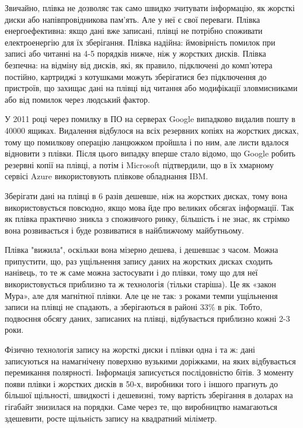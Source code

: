 \documentclass[a4paper,14pt]{extreport}
\begin{document}
Звичайно, плівка не дозволяє так само швидко зчитувати інформацію, як жорсткі диски або напівпровідникова пам'ять. Але у неї є свої переваги. Плівка енергоефективна: якщо дані вже записані, плівці не потрібно споживати електроенергію для їх зберігання. Плівка надійна: ймовірність помилок при записі або читанні на 4-5 порядків нижче, ніж у жорстких дисків. Плівка безпечна: на відміну від дисків, які, як правило, підключені до комп'ютера постійно, картриджі з котушками можуть зберігатися без підключення до пристроїв, що захищає дані на плівці від читання або модифікації зловмисниками або від помилок через людський фактор.\par

У 2011 році через помилку в ПО на серверах Google випадково видалив пошту в 40000 ящиках. Видалення відбулося на всіх резервних копіях на жорстких дисках, тому що помилкову операцію ланцюжком пройшла і по ним, але листи вдалося відновити з 
плівки. Після цього випадку вперше стало відомо, що Google робить  резервні копії на плівці, а потім і Microsoft підтвердили, що в їх хмарному сервісі Azure використовують плівкове обладнання IBM.\par

Зберігати дані на плівці в 6 разів дешевше, ніж на жорстких дисках, тому вона використовується повсюдно, якщо мова йде про великих обсягах інформації. Так як плівка практично зникла з споживчого ринку, більшість і не знає, як стрімко вона розвивається і буде розвиватися в найближчому майбутньому.\par

Плівка "вижила", оскільки вона мізерно дешева, і дешевшає з часом. Можна припустити, що, раз ущільнення запису даних на жорстких дисках сходить нанівець, то те ж саме можна застосувати і до плівки, тому що для неї використовується приблизно та ж технологія (тільки старіша). Це як «закон Мура», але для магнітної плівки. Але це не так: з роками темпи ущільнення записи на плівці не спадають, а зберігаються в районі 33\% в рік. Тобто, подвоєння обсягу даних, записаних на плівці, відбувається приблизно кожні 2-3 роки.

Фізично технологія запису на жорсткі диски і плівки одна і та ж: дані записуються на намагнічену поверхню вузькими доріжками, на яких відбувається перемикання полярності. Інформація записується послідовністю бітів. З моменту появи плівки і жорстких дисків в 50-х, виробники того і іншого прагнуть до більшої щільності, швидкості і дешевизні, тому вартість зберігання в доларах на гігабайт знизилася на порядки. Саме через те, що виробництво намагаються здешевити, росте щільність запису на квадратний міліметр.\par
\end{document}
